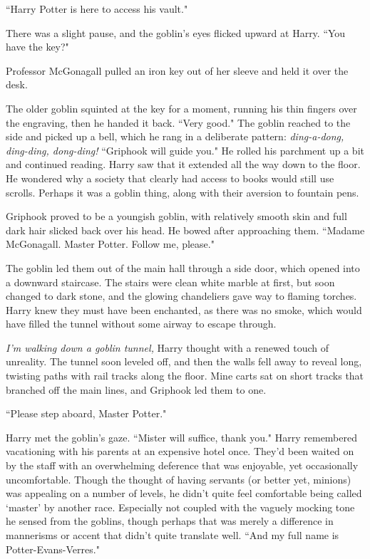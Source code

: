 ``Harry Potter is here to access his vault."

There was a slight pause, and the goblin's eyes flicked
upward at Harry. ``You have the key?"

Professor McGonagall pulled an iron key out of her sleeve
and held it over the desk.

The older goblin squinted at the key for a
moment, running his thin fingers over the engraving,
then he handed it back. ``Very good." The goblin reached to
the side and picked up a bell, which he rang in a
deliberate pattern: \emph{ding-a-dong, ding-ding, dong-ding!}
``Griphook will guide you." He rolled his parchment up a bit
and continued reading. Harry saw that it extended all the
way down to the floor. He wondered why a society that
clearly had access to books would still use scrolls. Perhaps
it was a goblin thing, along with their aversion to fountain pens.

Griphook proved to be a youngish goblin, with relatively
smooth skin and full dark hair slicked back over his head.
He bowed after approaching them. ``Madame McGonagall.
Master Potter. Follow me, please."

The goblin led them out of the main hall through a side
door, which opened into a downward staircase. The stairs
were clean white marble at first, but soon changed to dark
stone, and the glowing chandeliers gave way to flaming
torches. Harry knew they must have been enchanted, as
there was no smoke, which would have filled the tunnel
without some airway to escape through.

\emph{I'm walking down a goblin tunnel,} Harry thought with a
renewed touch of unreality. The tunnel soon leveled off,
and then the walls fell away to reveal long, twisting paths
with rail tracks along the floor. Mine carts sat on short
tracks that branched off the main lines, and Griphook led
them to one.

``Please step aboard, Master Potter."

Harry met the goblin's gaze. ``Mister will suffice, thank
you." Harry remembered vacationing with his parents at an
expensive hotel once. They'd been waited on by the staff
with an overwhelming deference that was enjoyable, yet
occasionally uncomfortable. Though the thought of
having servants (or better yet, minions) was appealing on
a number of levels, he didn't quite feel comfortable being
called `master' by another race. Especially not coupled with
the vaguely mocking tone he sensed from the goblins,
though perhaps that was merely a difference in
mannerisms or accent that didn't quite translate well. ``And
my full name is Potter-Evans-Verres."

